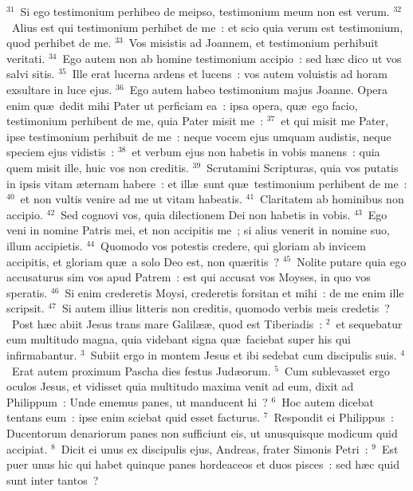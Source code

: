 ${}^{31}$~Si ego testimonium perhibeo de meipso, testimonium meum non est verum.
${}^{32}$~Alius est qui testimonium perhibet de me~: et scio quia verum est testimonium, quod perhibet de me.
${}^{33}$~Vos misistis ad Joannem, et testimonium perhibuit veritati.
${}^{34}$~Ego autem non ab homine testimonium accipio~: sed h\ae c dico ut vos salvi sitis.
${}^{35}$~Ille erat lucerna ardens et lucens~: vos autem voluistis ad horam exsultare in luce ejus.
${}^{36}$~Ego autem habeo testimonium majus Joanne. Opera enim qu\ae\ dedit mihi Pater ut perficiam ea~: ipsa opera, qu\ae\ ego facio, testimonium perhibent de me, quia Pater misit me~:
${}^{37}$~et qui misit me Pater, ipse testimonium perhibuit de me~: neque vocem ejus umquam audistis, neque speciem ejus vidistis~:
${}^{38}$~et verbum ejus non habetis in vobis manens~: quia quem misit ille, huic vos non creditis.
${}^{39}$~Scrutamini Scripturas, quia vos putatis in ipsis vitam \ae ternam habere~: et ill\ae\ sunt qu\ae\ testimonium perhibent de me~:
${}^{40}$~et non vultis venire ad me ut vitam habeatis.
${}^{41}$~Claritatem ab hominibus non accipio.
${}^{42}$~Sed cognovi vos, quia dilectionem Dei non habetis in vobis.
${}^{43}$~Ego veni in nomine Patris mei, et non accipitis me~; si alius venerit in nomine suo, illum accipietis.
${}^{44}$~Quomodo vos potestis credere, qui gloriam ab invicem accipitis, et gloriam qu\ae\ a solo Deo est, non qu\ae ritis~?
${}^{45}$~Nolite putare quia ego accusaturus sim vos apud Patrem~: est qui accusat vos Moyses, in quo vos speratis.
${}^{46}$~Si enim crederetis Moysi, crederetis forsitan et mihi~: de me enim ille scripsit.
${}^{47}$~Si autem illius litteris non creditis, quomodo verbis meis credetis~?
~\lettrine[lines=10,image=true,loversize=0.05,lraise=-0.03]{P}{}ost h\ae c abiit Jesus trans mare Galil\ae \ae , quod est Tiberiadis~:
${}^{2}$~et sequebatur eum multitudo magna, quia videbant signa qu\ae\ faciebat super his qui infirmabantur.
${}^{3}$~Subiit ergo in montem Jesus et ibi sedebat cum discipulis suis.
${}^{4}$~Erat autem proximum Pascha dies festus Jud\ae orum.
${}^{5}$~Cum sublevasset ergo oculos Jesus, et vidisset quia multitudo maxima venit ad eum, dixit ad Philippum~: Unde ememus panes, ut manducent hi~?
${}^{6}$~Hoc autem dicebat tentans eum~: ipse enim sciebat quid esset facturus.
${}^{7}$~Respondit ei Philippus~: Ducentorum denariorum panes non sufficiunt eis, ut unusquisque modicum quid accipiat.
${}^{8}$~Dicit ei unus ex discipulis ejus, Andreas, frater Simonis Petri~:
${}^{9}$~Est puer unus hic qui habet quinque panes hordeaceos et duos pisces~: sed h\ae c quid sunt inter tantos~?
